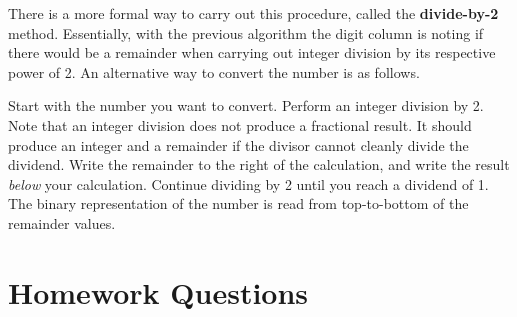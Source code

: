 \documentclass[letterpaper, 10pt]{book}
\begin{document}
\vspace{1em}
There is a more formal way to carry out this procedure, called the \textbf{divide-by-2} method. Essentially, with the previous algorithm the digit column is noting if there would be a remainder when carrying out integer division by its respective power of 2. An alternative way to convert the number is as follows.

Start with the number you want to convert. Perform an integer division by 2. Note that an integer division does not produce a fractional result. It should produce an integer and a remainder if the divisor cannot cleanly divide the dividend. Write the remainder to the right of the calculation, and write the result \textit{below} your calculation. Continue dividing by 2 until you reach a dividend of 1. The binary representation of the number is read from top-to-bottom of the remainder values.

\vfill\clearpage
\section*{Homework Questions}
\end{document}
